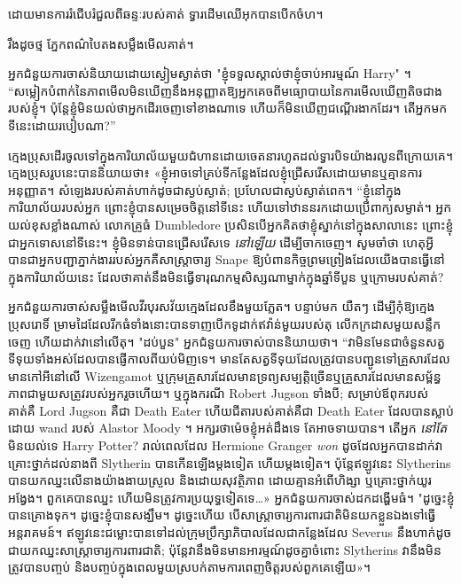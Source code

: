 ដោយ​មាន​ការ​រំជើបរំជួល​ពី​ឆន្ទៈ​របស់​គាត់ ទ្វារ​ដើមឈើ​អុក​បាន​បើក​ចំហ។

រឹងដូចថ្ម ភ្នែកពណ៌បៃតងសម្លឹងមើលគាត់។

អ្នកជំនួយការចាស់និយាយដោយស្ងៀមស្ងាត់ថា "ខ្ញុំទទួលស្គាល់ថាខ្ញុំចាប់អារម្មណ៍ Harry" ។ “សម្លៀកបំពាក់នៃភាពមើលមិនឃើញនឹងអនុញ្ញាតឱ្យអ្នកគេចពីមធ្យោបាយនៃការមើលឃើញតិចជាងរបស់ខ្ញុំ។ ប៉ុន្តែ​ខ្ញុំ​មិន​យល់​ថា​អ្នក​ដើរ​ចេញ​ទៅ​ខាង​ណា​ទេ ហើយ​ក៏​មិន​ឃើញ​ជណ្ដើរ​ងាក​ដែរ។ តើអ្នកមកទីនេះដោយរបៀបណា?”

ក្មេង​ប្រុស​ដើរ​ចូល​ទៅ​ក្នុង​ការិយាល័យ​មួយ​ជំហាន​ដោយ​ចេតនា​រហូត​ដល់​ទ្វារ​បិទ​យ៉ាង​រលូន​ពី​ក្រោយ​គេ។ ក្មេង​ប្រុស​រូប​នេះ​បាន​និយាយ​ថា៖ «ខ្ញុំ​អាច​ទៅ​គ្រប់​ទី​កន្លែង​ដែល​ខ្ញុំ​ជ្រើស​រើស​ដោយ​មាន​ឬ​គ្មាន​ការ​អនុញ្ញាត។ សំឡេងរបស់គាត់ហាក់ដូចជាស្ងប់ស្ងាត់; ប្រហែលជាស្ងប់ស្ងាត់ពេក។ “ខ្ញុំនៅក្នុងការិយាល័យរបស់អ្នក ព្រោះខ្ញុំបានសម្រេចចិត្តនៅទីនេះ ហើយទៅឋាននរកដោយប្រើពាក្យសម្ងាត់។ អ្នកយល់ខុសខ្លាំងណាស់ លោកគ្រូធំ Dumbledore ប្រសិនបើអ្នកគិតថាខ្ញុំស្នាក់នៅក្នុងសាលានេះ ព្រោះខ្ញុំជាអ្នកទោសនៅទីនេះ។ ខ្ញុំមិនទាន់បានជ្រើសរើសទេ \emph{នៅឡើយ} ដើម្បីចាកចេញ។ សូមចាំថា ហេតុអ្វីបានជាអ្នកបញ្ជាភ្នាក់ងាររបស់អ្នកគឺសាស្រ្តាចារ្យ Snape ឱ្យបំពានកិច្ចព្រមព្រៀងដែលយើងបានធ្វើនៅក្នុងការិយាល័យនេះ ដែលថាគាត់នឹងមិនធ្វើទារុណកម្មសិស្សណាម្នាក់ក្នុងឆ្នាំទីបួន ឬក្រោមរបស់គាត់?

អ្នកជំនួយការចាស់សម្លឹងមើលវីរបុរសវ័យក្មេងដែលខឹងមួយភ្លែត។ បន្ទាប់មក យឺតៗ ដើម្បីកុំឱ្យក្មេងប្រុសរោទិ៍ ម្រាមដៃដែលរីកធំទាំងនោះបានទាញបើកទូដាក់ឥវ៉ាន់មួយរបស់តុ លើកក្រដាសមួយសន្លឹកចេញ ហើយដាក់វានៅលើតុ។ "ដប់បួន" អ្នកជំនួយការចាស់បាននិយាយថា។ “វាមិនមែនជាចំនួនសត្វទីទុយទាំងអស់ដែលបានផ្ញើកាលពីយប់មិញទេ។ មានតែសត្វទីទុយដែលត្រូវបានបញ្ជូនទៅគ្រួសារដែលមានកៅអីនៅលើ Wizengamot ឬក្រុមគ្រួសារដែលមានទ្រព្យសម្បត្តិច្រើនឬគ្រួសារដែលមានសម្ព័ន្ធភាពជាមួយសត្រូវរបស់អ្នករួចហើយ។ ឬក្នុងករណី Robert Jugson ទាំងបី; សម្រាប់ឪពុករបស់គាត់គឺ Lord Jugson គឺជា Death Eater ហើយជីតារបស់គាត់គឺជា Death Eater ដែលបានស្លាប់ដោយ wand របស់ Alastor Moody ។ អក្សរ​ថា​ម៉េច​ខ្ញុំ​អត់​ដឹង​ទេ តែ​អាច​ទាយ​បាន។ តើអ្នក \emph{នៅតែ} មិនយល់ទេ Harry Potter? រាល់ពេលដែល Hermione Granger \emph{won} ដូចដែលអ្នកបានដាក់វា គ្រោះថ្នាក់ដល់នាងពី Slytherin បានកើនឡើងម្តងទៀត ហើយម្តងទៀត។ ប៉ុន្តែឥឡូវនេះ Slytherins បានយកឈ្នះលើនាងយ៉ាងងាយស្រួល និងដោយសុវត្ថិភាព ដោយគ្មានអំពើហិង្សា ឬគ្រោះថ្នាក់យូរអង្វែង។ ពួក​គេ​បាន​ឈ្នះ ហើយ​មិន​ត្រូវ​ការ​ប្រយុទ្ធ​ទៀត​ទេ…» អ្នក​ជំនួយ​ការ​ចាស់​ដក​ដង្ហើម​ធំ។ "ដូច្នេះខ្ញុំបានគ្រោងទុក។ ដូច្នេះខ្ញុំបានសង្ឃឹម។ ដូច្នេះ​ហើយ បើ​សាស្ត្រាចារ្យ​ការពារ​ជាតិ​មិន​យក​ខ្លួន​ឯង​ទៅ​ធ្វើ​អន្តរាគមន៍។ ឥឡូវនេះជម្លោះបានទៅដល់ក្រុមប្រឹក្សាភិបាលដែលជាកន្លែងដែល Severus នឹងហាក់ដូចជាយកឈ្នះសាស្រ្តាចារ្យការពារជាតិ; ប៉ុន្តែ​វា​នឹង​មិន​មាន​អារម្មណ៍​ដូចគ្នា​ចំពោះ Slytherins វា​នឹង​មិន​ត្រូវ​បាន​បញ្ចប់ និង​បញ្ចប់​ក្នុង​ពេល​មួយ​ស្របក់​តាម​ការ​ពេញចិត្ត​របស់​ពួកគេ​ឡើយ»។

